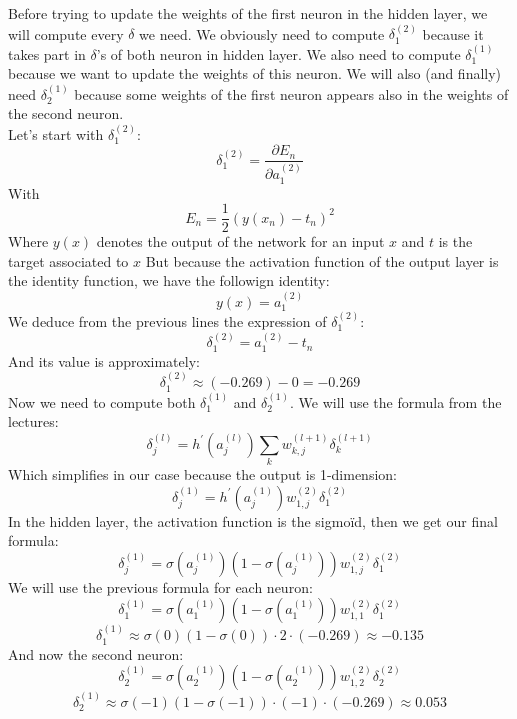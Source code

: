 \documentclass[a4paper, 10pt]{article}
\begin{document}
Before trying to update the weights of the first neuron in the hidden layer, we will compute every $\delta$ we need.
We obviously need to compute $\delta_1^{(2)}$ because it takes part in $\delta$'s of both neuron in hidden layer.
We also need to compute $\delta_1^{(1)}$ because we want to update the weights of this neuron. We will also (and finally) need 
$\delta_2^{(1)}$ because some weights of the first neuron appears also in the weights of the second neuron.
\\
Let's start with $\delta_1^{(2)}$:
$$
\delta_1^{(2)} =  \frac{\partial E_n}{\partial a_1^{(2)}}
$$
With 
$$
E_n = \frac{1}{2} (y(x_n)-t_n)^2
$$
Where $y(x)$ denotes the output of the network for an input $x$ and $t$ is the target associated to $x$
But because the activation function of the output layer is the identity function, we have the followign identity:
$$
y(x) = a_1^{(2)}
$$
We deduce from the previous lines the expression of $\delta_1^{(2)}$:
$$
\delta_1^{(2)} = a_1^{(2)} - t_n
$$
And its value is approximately:
$$
\delta_1^{(2)} \approx (-0.269) - 0 = -0.269
$$
Now we need to compute both $\delta_1^{(1)}$ and $\delta_2^{(1)}$.
We will use the formula from the lectures:
$$
\delta_j^{(l)} = h^\prime(a_j^{(l)})\sum_k w_{k,j}^{(l+1)}\delta_k^{(l+1)} 
$$
Which simplifies in our case because the output is 1-dimension:
$$
\delta_j^{(1)} = h^\prime(a_j^{(1)})w_{1,j}^{(2)}\delta_1^{(2)} 
$$
In the hidden layer, the activation function is the sigmoïd, then we get our final formula:
$$
\delta_j^{(1)} = \sigma(a_j^{(1)})(1-\sigma(a_j^{(1)}))w_{1,j}^{(2)}\delta_1^{(2)} 
$$
We will use the previous formula for each neuron:
$$
\delta_1^{(1)} = \sigma(a_1^{(1)})(1-\sigma(a_1^{(1)}))w_{1,1}^{(2)}\delta_1^{(2)} 
$$
$$
\delta_1^{(1)} \approx \sigma(0)(1-\sigma(0))\cdot2\cdot(-0.269) \approx -0.135
$$
And now the second neuron:
$$
\delta_2^{(1)} = \sigma(a_2^{(1)})(1-\sigma(a_2^{(1)}))w_{1,2}^{(2)}\delta_2^{(2)} 
$$
$$
\delta_2^{(1)} \approx \sigma(-1)(1-\sigma(-1))\cdot(-1)\cdot(-0.269) \approx 0.053
$$
\end{document}
